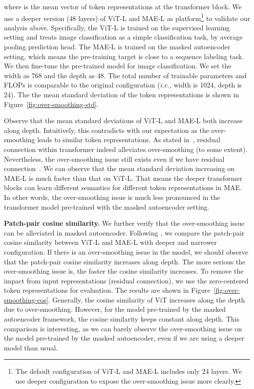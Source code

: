 \documentclass{article}
\theoremstyle{plain}
\theoremstyle{definition}
\theoremstyle{remark}
\newcommand{\ie}{\emph{i.e.,}\xspace}
\begin{document}
where  is the mean vector of token representations at the  transformer block. 
We use a deeper version (48 layers) of ViT-L and MAE-L as platform\footnote{The default configuration of ViT-L and MAE-L includes only 24 layers. We use deeper configuration to expose the over-smoothing issue more clearly.} to validate our analysis above. Specifically, the ViT-L is trained on the supervised learning setting and treats image classification as a simple classification task, by average pooling prediction head. The MAE-L is trained on the masked autoencoder setting, which means the pre-training target is close to a sequence labeling task. We then fine-tune the pre-trained model for image classification. We set the width as 768 and the depth as 48. The total number of trainable parameters and FLOPs is comparable to the original configuration (\ie width is 1024, depth is 24). The the mean standard deviation of the token representations is shown in Figure~\ref{fig:over-smoothing-std}. 

Observe that the mean standard deviations of ViT-L and MAE-L both increase along depth. Intuitively, this contradicts with our expectation as the over-smoothing leads to similar token representations. As stated in~\citep{dong2021attention}, residual connection within transformer indeed alleviates over-smoothing (to some extent). Nevertheless, the over-smoothing issue still exists even if we have residual connection~\citep{dong2021attention,shi2021revisiting}.  We can observe that the mean standard deviation increasing on MAE-L is much faster than that on ViT-L. That means the deeper transformer blocks can learn different semantics for different token representations in MAE. In other words, the over-smoothing issue is much less pronounced in the transformer model pre-trained with the masked autoencoder setting. 


\textbf{Patch-pair cosine similarity.} We further verify that the over-smoothing issue can be alleviated in masked autoencoder. Following \citet{gong2021vision}, we compare the patch-pair cosine similarity between ViT-L and MAE-L with deeper and narrower configuration. If there is an over-smoothing issue in the model, we should observe that the patch-pair cosine similarity increases along depth. The more serious the over-smoothing issue is, the faster the cosine similarity increases. To remove the impact from input representations (residual connection), we use the zero-centered token representations  for evaluation. The results are shown in Figure~\ref{fig:over-smoothing-cos}. Generally, the cosine similarity of ViT increases along the depth due to over-smoothing. However, for the model pre-trained by the masked autoencoder framework, the cosine similarity keeps constant along depth. This comparison is interesting, as we can barely observe the over-smoothing issue on the model pre-trained by the masked autoencoder, even if we are using a deeper model than usual. 
\end{document}
